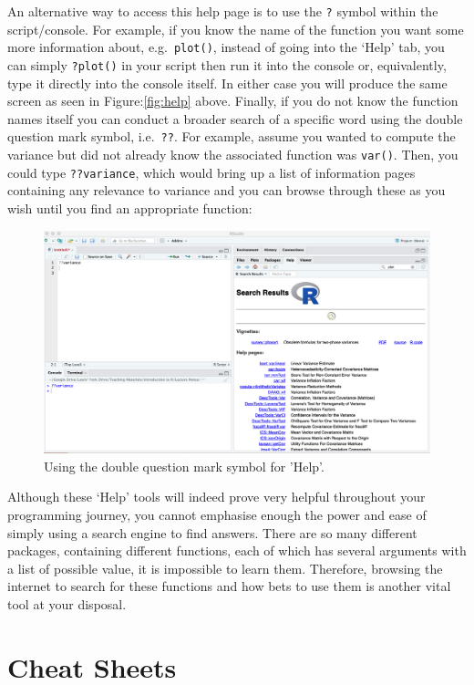 \documentclass[
]{book}
\theoremstyle{definition}
\theoremstyle{definition}
\theoremstyle{definition}
\theoremstyle{definition}
\theoremstyle{remark}
\begin{document}
An alternative way to access this help page is to use the \texttt{?} symbol within the script/console. For example, if you know the name of the function you want some more information about, e.g.~\texttt{plot()}, instead of going into the `Help' tab, you can simply \texttt{?plot()} in your script then run it into the console or, equivalently, type it directly into the console itself. In either case you will produce the same screen as seen in Figure:\ref{fig:help} above. Finally, if you do not know the function names itself you can conduct a broader search of a specific word using the double question mark symbol, i.e.~\texttt{??}. For example, assume you wanted to compute the variance but did not already know the associated function was \texttt{var()}. Then, you could type \texttt{??variance}, which would bring up a list of information pages containing any relevance to variance and you can browse through these as you wish until you find an appropriate function:

\begin{figure}

{\centering \includegraphics[width=0.7\linewidth]{Figures/Help2} 

}

\caption{Using the double question mark symbol for 'Help'.}\label{fig:help2}
\end{figure}

Although these `Help' tools will indeed prove very helpful throughout your programming journey, you cannot emphasise enough the power and ease of simply using a search engine to find answers. There are so many different packages, containing different functions, each of which has several arguments with a list of possible value, it is impossible to learn them. Therefore, browsing the internet to search for these functions and how bets to use them is another vital tool at your disposal.

\hypertarget{cheat-sheets}{%
\chapter{Cheat Sheets}\label{cheat-sheets}}
\end{document}
